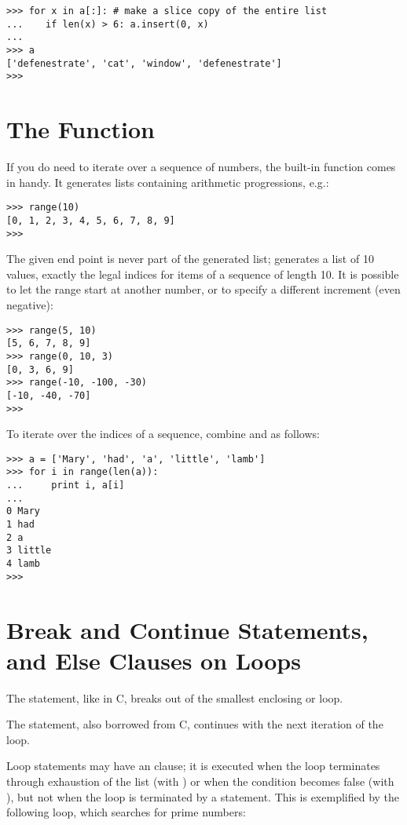 \bcode\begin{verbatim}
>>> for x in a[:]: # make a slice copy of the entire list
...    if len(x) > 6: a.insert(0, x)
... 
>>> a
['defenestrate', 'cat', 'window', 'defenestrate']
>>> 
\end{verbatim}\ecode

\section{The  Function}

If you do need to iterate over a sequence of numbers, the built-in
function  comes in handy.  It generates lists containing
arithmetic progressions, e.g.:

\bcode\begin{verbatim}
>>> range(10)
[0, 1, 2, 3, 4, 5, 6, 7, 8, 9]
>>> 
\end{verbatim}\ecode
%
The given end point is never part of the generated list; 
generates a list of 10 values, exactly the legal indices for items of a
sequence of length 10.  It is possible to let the range start at another
number, or to specify a different increment (even negative):

\bcode\begin{verbatim}
>>> range(5, 10)
[5, 6, 7, 8, 9]
>>> range(0, 10, 3)
[0, 3, 6, 9]
>>> range(-10, -100, -30)
[-10, -40, -70]
>>> 
\end{verbatim}\ecode
%
To iterate over the indices of a sequence, combine  and
 as follows:

\bcode\begin{verbatim}
>>> a = ['Mary', 'had', 'a', 'little', 'lamb']
>>> for i in range(len(a)):
...     print i, a[i]
... 
0 Mary
1 had
2 a
3 little
4 lamb
>>> 
\end{verbatim}\ecode

\section{Break and Continue Statements, and Else Clauses on Loops}

The  statement, like in C, breaks out of the smallest
enclosing  or  loop.

The  statement, also borrowed from C, continues with the
next iteration of the loop.

Loop statements may have an  clause; it is executed when the
loop terminates through exhaustion of the list (with ) or when
the condition becomes false (with ), but not when the loop is
terminated by a  statement.  This is exemplified by the
following loop, which searches for prime numbers:

